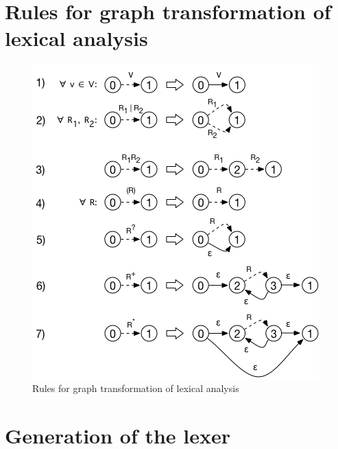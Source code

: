\newpage

\section*{Rules for graph transformation of lexical analysis}
\label{sec:rules_graph_transformation}
\begin{figure}[bth]
	\centering
	\includegraphics[scale=0.6]{./appendix/img/equivalence_automata_regex}
	\caption[Rules for graph transformation of lexical analysis]{Rules for graph transformation of lexical analysis}
	\label{fig:rules_graph_transformation}
\end{figure}
\noindent

\newpage

\section*{Generation of the lexer}
\label{sec:lexer}

